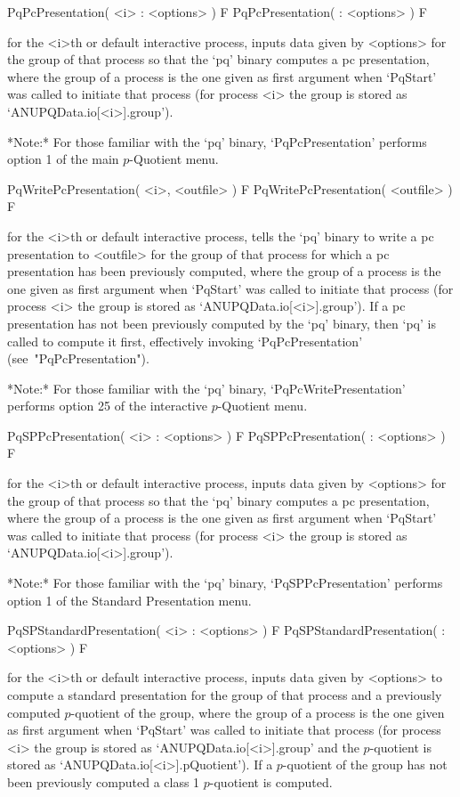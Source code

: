 \>PqPcPresentation( <i> : <options> ) F
\>PqPcPresentation( : <options> ) F

for the <i>th or default interactive {\ANUPQ} process, inputs data  given
by <options> for the group of  that  process  so  that  the  `pq'  binary
computes a pc presentation, where the group of a process is the one given
as first argument when `PqStart' was called to initiate that process (for
process <i> the group is stored as `ANUPQData.io[<i>].group').

*Note:* For those  familiar  with  the  `pq'  binary,  `PqPcPresentation'
performs option 1 of the main $p$-Quotient menu.

\>PqWritePcPresentation( <i>, <outfile> ) F
\>PqWritePcPresentation( <outfile> ) F

for the <i>th or default interactive {\ANUPQ}  process,  tells  the  `pq'
binary to write a pc presentation to <outfile>  for  the  group  of  that
process for which a pc presentation has been previously  computed,  where
the group of a process is the one given as first argument when  `PqStart'
was called to initiate that process (for process <i> the group is  stored
as  `ANUPQData.io[<i>].group').  If  a  pc  presentation  has  not   been
previously computed by the `pq' binary, then `pq' is called to compute it
first, effectively invoking `PqPcPresentation' (see~"PqPcPresentation").

*Note:* For those familiar with the `pq' binary,  `PqPcWritePresentation'
performs option 25 of the interactive $p$-Quotient menu.

\>PqSPPcPresentation( <i> : <options> ) F
\>PqSPPcPresentation( : <options> ) F

for the <i>th or default interactive {\ANUPQ} process, inputs data  given
by <options> for the group of  that  process  so  that  the  `pq'  binary
computes a pc presentation, where the group of a process is the one given
as first argument when `PqStart' was called to initiate that process (for
process <i> the group is stored as `ANUPQData.io[<i>].group').

*Note:* For those familiar with  the  `pq'  binary,  `PqSPPcPresentation'
performs option 1 of the Standard Presentation menu.

\>PqSPStandardPresentation( <i> : <options> ) F
\>PqSPStandardPresentation( : <options> ) F

for the <i>th or default interactive {\ANUPQ} process, inputs data  given
by <options> to compute a standard presentation for  the  group  of  that
process and a previously computed $p$-quotient of the  group,  where  the
group of a process is the one given as first argument when `PqStart'  was
called to initiate that process (for process <i> the group is  stored  as
`ANUPQData.io[<i>].group'   and   the   $p$-quotient   is    stored    as
`ANUPQData.io[<i>].pQuotient'). If a $p$-quotient of the  group  has  not
been previously computed a class 1 $p$-quotient is computed.

